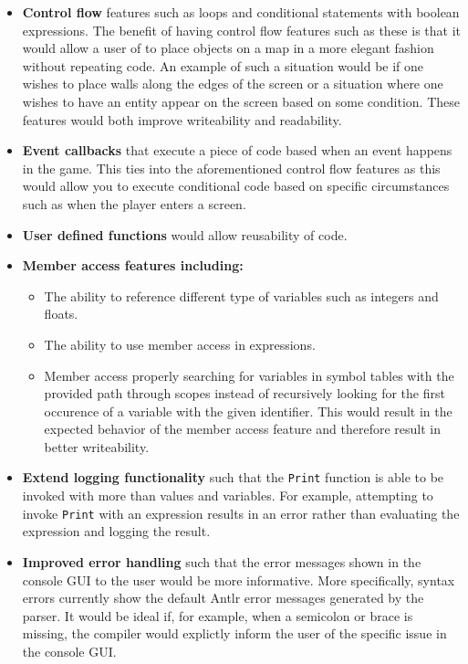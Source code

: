 \begin{itemize}
    \item
      \textbf{Control flow} features such as loops and conditional statements with boolean expressions. The benefit of having control flow features such as these is that it would allow a user of \dazel{} to place objects on a map in a more elegant fashion without repeating code. An example of such a situation would be if one wishes to place walls along the edges of the screen or a situation where one wishes to have an entity appear on the screen based on some condition. These features would both improve writeability and readability.
    \item
      \textbf{Event callbacks} that execute a piece of code based when an event happens in the game. This ties into the aforementioned control flow features as this would allow you to execute conditional code based on specific circumstances such as when the player enters a screen. 
    \item
      \textbf{User defined functions} would allow reusability of code. 
    \item
      \textbf{Member access features including:}
      \begin{itemize}
        \item
            The ability to reference different type of variables such as integers and floats.
        \item
            The ability to use member access in expressions.    
        \item
            Member access properly searching for variables in symbol tables with the provided path through scopes instead of recursively looking for the first occurence of a variable with the given identifier. This would result in the expected behavior of the member access feature and therefore result in better writeability.
      \end{itemize}
      \item
        \textbf{Extend logging functionality} such that the \texttt{Print} function is able to be invoked with more than values and variables. For example, attempting to invoke \texttt{Print} with an expression results in an error rather than evaluating the expression and logging the result.
    \item
      \textbf{Improved error handling} such that the error messages shown in the console GUI to the user would be more informative. More specifically, syntax errors currently show the default Antlr error messages generated by the parser. It would be ideal if, for example, when a semicolon or brace is missing, the compiler would explictly inform the user of the specific issue in the console GUI.
\end{itemize}

